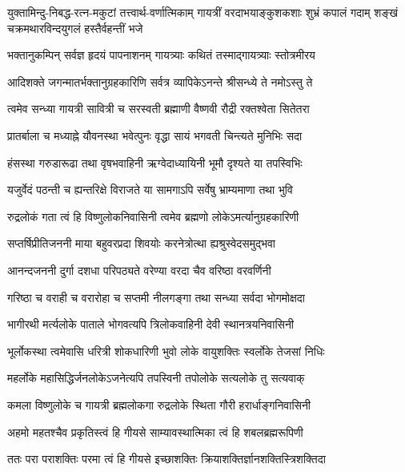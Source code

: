 
{युक्तामिन्दु-निबद्ध-रत्न-मकुटां तत्त्वार्थ-वर्णात्मिकाम्}
{गायत्रीं वरदाभयाङ्कुशकशाः शुभ्रं कपालं गदाम्}
{शङ्खं चक्रमथारविन्दयुगलं हस्तैर्वहन्तीं भजे}

\twolineshloka
{भक्तानुकम्पिन् सर्वज्ञ हृदयं पापनाशनम्}
{गायत्र्याः कथितं तस्माद्गायत्र्याः स्तोत्रमीरय}

\twolineshloka
{आदिशक्ते जगन्मातर्भक्तानुग्रहकारिणि}
{सर्वत्र व्यापिकेऽनन्ते श्रीसन्ध्ये ते नमोऽस्तु ते}

\twolineshloka
{त्वमेव सन्ध्या गायत्री सावित्री च सरस्वती}
{ब्रह्माणी वैष्णवी रौद्री रक्तश्वेता सितेतरा}

\twolineshloka
{प्रातर्बाला च मध्याह्ने यौवनस्था भवेत्पुनः}
{वृद्धा सायं भगवती चिन्त्यते मुनिभिः सदा}

\twolineshloka
{हंसस्था गरुडारूढा तथा वृषभवाहिनी}
{ऋग्वेदाध्यायिनी भूमौ दृश्यते या तपस्विभिः}

\twolineshloka
{यजुर्वेदं पठन्ती च ह्यन्तरिक्षे विराजते}
{या सामगाऽपि सर्वेषु भ्राम्यमाणा तथा भुवि}

\twolineshloka
{रुद्रलोकं गता त्वं हि विष्णुलोकनिवासिनी}
{त्वमेव ब्रह्मणो लोकेऽमर्त्यानुग्रहकारिणी}

\twolineshloka
{सप्तर्षिप्रीतिजननी माया बहुवरप्रदा}
{शिवयोः करनेत्रोत्था ह्यश्रुस्वेदसमुद्भवा}

\twolineshloka
{आनन्दजननी दुर्गा दशधा परिपठ्यते}
{वरेण्या वरदा चैव वरिष्ठा वरवर्णिनी}

\twolineshloka
{गरिष्ठा च वराही च वरारोहा च सप्तमी}
{नीलगङ्गा तथा सन्ध्या सर्वदा भोगमोक्षदा}

\twolineshloka
{भागीरथी मर्त्यलोके पाताले भोगवत्यपि}
{त्रिलोकवाहिनी देवी स्थानत्रयनिवासिनी}

\twolineshloka
{भूर्लोकस्था त्वमेवासि धरित्री शोकधारिणी}
{भुवो लोके वायुशक्तिः स्वर्लोके तेजसां निधिः}

\twolineshloka
{महर्लोके महासिद्धिर्जनलोकेऽजनेत्यपि}
{तपस्विनी तपोलोके सत्यलोके तु सत्यवाक्}

\twolineshloka
{कमला विष्णुलोके च गायत्री ब्रह्मलोकगा}
{रुद्रलोके स्थिता गौरी हरार्धाङ्गनिवासिनी}

\twolineshloka
{अहमो महतश्चैव प्रकृतिस्त्वं हि गीयसे}
{साम्यावस्थात्मिका त्वं हि शबलब्रह्मरूपिणी}

\twolineshloka
{ततः परा पराशक्तिः परमा त्वं हि गीयसे}
{इच्छाशक्तिः क्रियाशक्तिर्ज्ञानशक्तिस्त्रिशक्तिदा}

